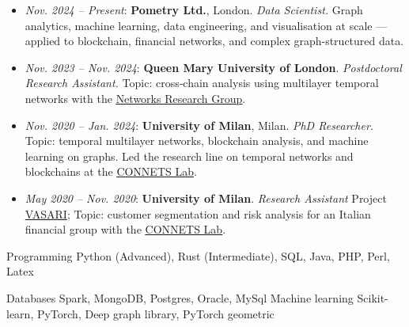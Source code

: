 \documentclass[11pt, a4paper]{awesome-cv}
\begin{document}
\begin{refsection}

\begin{itemize}
    \item \textit{Nov. 2024 – Present}: \textbf{Pometry Ltd.}, London. \textit{Data Scientist.}  
    Graph analytics, machine learning, data engineering, and visualisation at scale — applied to blockchain, financial networks, and complex graph-structured data.  

    \item \textit{Nov. 2023 – Nov. 2024}: \textbf{Queen Mary University of London}. \textit{Postdoctoral Research Assistant.}
    Topic: cross‑chain analysis using multilayer temporal networks with the \underline{\href{https://networks.eecs.qmul.ac.uk/}{Networks Research Group}}.

    \item \textit{Nov. 2020 – Jan. 2024}: \textbf{University of Milan}, Milan. \textit{PhD Researcher.}
    Topic: temporal multilayer networks, blockchain analysis, and machine learning on graphs. Led the research line on temporal networks and blockchains at the \underline{\href{https://connets.di.unimi.it/}{CONNETS Lab}}.

    \item \textit{May 2020 – Nov. 2020}: \textbf{University of Milan}. \textit{Research Assistant}  
    Project \href{https://www.vasariartexperience.it/}{VASARI}; Topic: customer segmentation and risk analysis for an Italian financial group with the \underline{\href{https://connets.di.unimi.it/}{CONNETS Lab}}.  
\end{itemize}




\begin{cvskills}
  \cvskill
    {Programming} %
    {Python (Advanced), Rust (Intermediate), SQL, Java, PHP, Perl, Latex} %
    

  \cvskill
    {Databases} %
    {Spark, MongoDB, Postgres, Oracle, MySql} %
  \cvskill
    {Machine learning} %
    {Scikit-learn, PyTorch, Deep graph library, PyTorch geometric} %


\end{cvskills}
\end{refsection}
\end{document}
